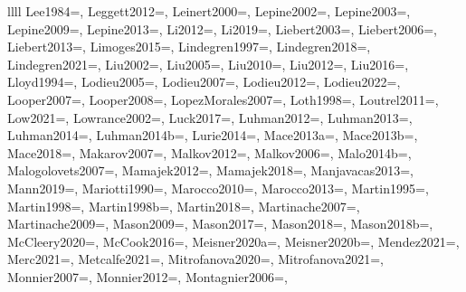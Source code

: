 \documentclass[twocolumn,tighten,twocolappendix]{aastex631}
\begin{document}
\begin{deluxetable*}{llll}
{Lee1984=\cite{lee1984},
Leggett2012=\cite{leggett2012},
Leinert2000=\cite{leinert2000},
Lepine2002=\cite{lepine2002},
Lepine2003=\cite{lepine2003},
Lepine2009=\cite{lepine2009},
Lepine2013=\cite{lepine2013},
Li2012=\cite{li2012},
Li2019=\cite{li2019},
Liebert2003=\cite{liebert2003},
Liebert2006=\cite{liebert2006},
Liebert2013=\cite{liebert2013},
Limoges2015=\cite{limoges2015},
Lindegren1997=\cite{lindegren1997},
Lindegren2018=\cite{lindegren2018},
Lindegren2021=\cite{lindegren2021},
Liu2002=\cite{liu2002},
Liu2005=\cite{liu2005},
Liu2010=\cite{liu2010},
Liu2012=\cite{liu2012},
Liu2016=\cite{liu2016},
Lloyd1994=\cite{lloyd1994},
Lodieu2005=\cite{lodieu2005},
Lodieu2007=\cite{lodieu2007},
Lodieu2012=\cite{lodieu2012},
Lodieu2022=\cite{lodieu2022},
Looper2007=\cite{looper2007},
Looper2008=\cite{looper2008},
LopezMorales2007=\cite{lopez2007},
Loth1998=\cite{loth1998},
Loutrel2011=\cite{loutrel2011},
Low2021=\cite{low2021},
Lowrance2002=\cite{lowrance2002},
Luck2017=\cite{luck2017},
Luhman2012=\cite{luhman2012},
Luhman2013=\cite{luhman2013},
Luhman2014=\cite{luhman2014},
Luhman2014b=\cite{luhman2014b},
Lurie2014=\cite{lurie2014},
Mace2013a=\cite{mace2013a},
Mace2013b=\cite{mace2013b},
Mace2018=\cite{mace2018},
Makarov2007=\cite{makarov2007},
Malkov2012=\cite{malkov2012},
Malkov2006=\cite{malkov2006},
Malo2014b=\cite{malo2014b},
Malogolovets2007=\cite{malogolovets2007},
Mamajek2012=\cite{mamajek2012},
Mamajek2018=\cite{mamajek2018},
Manjavacas2013=\cite{manjavacas2013},
Mann2019=\cite{mann2019},
Mariotti1990=\cite{mariotti1990},
Marocco2010=\cite{marocco2010},
Marocco2013=\cite{marocco2013},
Martin1995=\cite{martin1995},
Martin1998=\cite{martin1998},
Martin1998b=\cite{martin1998b},
Martin2018=\cite{martin2018},
Martinache2007=\cite{martinache2007},
Martinache2009=\cite{martinache2009},
Mason2009=\cite{mason2009},
Mason2017=\cite{mason2017},
Mason2018=\cite{mason2018},
Mason2018b=\cite{mason2018b},
McCleery2020=\cite{mccleery2020},
McCook2016=\cite{mccook2016},
Meisner2020a=\cite{meisner2020a},
Meisner2020b=\cite{meisner2020b},
Mendez2021=\cite{mendez2021},
Merc2021=\cite{merc2021},
Metcalfe2021=\cite{metcalfe2021},
Mitrofanova2020=\cite{mitrofanova2020},
Mitrofanova2021=\cite{mitrofanova2021},
Monnier2007=\cite{monnier2007},
Monnier2012=\cite{monnier2012},
Montagnier2006=\cite{montagnier2006},
}
\end{deluxetable*}
\end{document}
